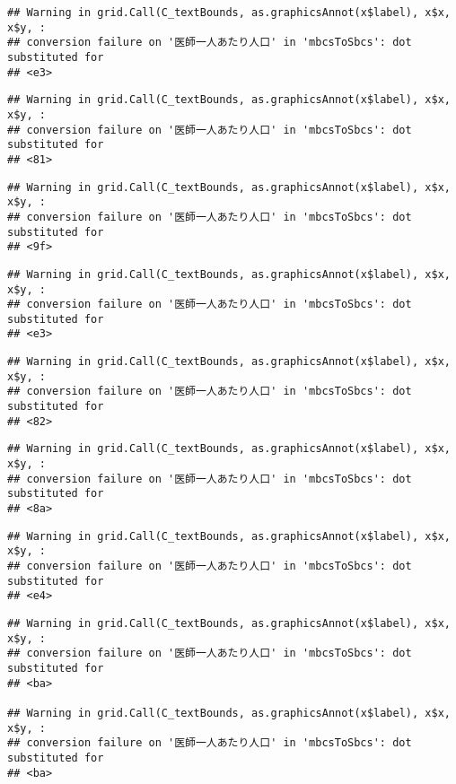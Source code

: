 \documentclass[
]{article}
\begin{document}
\begin{verbatim}
## Warning in grid.Call(C_textBounds, as.graphicsAnnot(x$label), x$x, x$y, :
## conversion failure on '医師一人あたり人口' in 'mbcsToSbcs': dot substituted for
## <e3>
\end{verbatim}

\begin{verbatim}
## Warning in grid.Call(C_textBounds, as.graphicsAnnot(x$label), x$x, x$y, :
## conversion failure on '医師一人あたり人口' in 'mbcsToSbcs': dot substituted for
## <81>
\end{verbatim}

\begin{verbatim}
## Warning in grid.Call(C_textBounds, as.graphicsAnnot(x$label), x$x, x$y, :
## conversion failure on '医師一人あたり人口' in 'mbcsToSbcs': dot substituted for
## <9f>
\end{verbatim}

\begin{verbatim}
## Warning in grid.Call(C_textBounds, as.graphicsAnnot(x$label), x$x, x$y, :
## conversion failure on '医師一人あたり人口' in 'mbcsToSbcs': dot substituted for
## <e3>
\end{verbatim}

\begin{verbatim}
## Warning in grid.Call(C_textBounds, as.graphicsAnnot(x$label), x$x, x$y, :
## conversion failure on '医師一人あたり人口' in 'mbcsToSbcs': dot substituted for
## <82>
\end{verbatim}

\begin{verbatim}
## Warning in grid.Call(C_textBounds, as.graphicsAnnot(x$label), x$x, x$y, :
## conversion failure on '医師一人あたり人口' in 'mbcsToSbcs': dot substituted for
## <8a>
\end{verbatim}

\begin{verbatim}
## Warning in grid.Call(C_textBounds, as.graphicsAnnot(x$label), x$x, x$y, :
## conversion failure on '医師一人あたり人口' in 'mbcsToSbcs': dot substituted for
## <e4>
\end{verbatim}

\begin{verbatim}
## Warning in grid.Call(C_textBounds, as.graphicsAnnot(x$label), x$x, x$y, :
## conversion failure on '医師一人あたり人口' in 'mbcsToSbcs': dot substituted for
## <ba>

## Warning in grid.Call(C_textBounds, as.graphicsAnnot(x$label), x$x, x$y, :
## conversion failure on '医師一人あたり人口' in 'mbcsToSbcs': dot substituted for
## <ba>
\end{verbatim}
\end{document}
